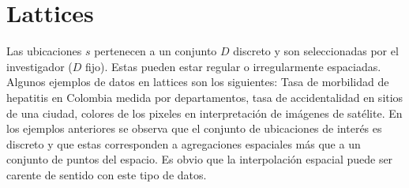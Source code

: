 \section{Lattices}

Las ubicaciones $s$ pertenecen a un conjunto $D$ discreto y son seleccionadas por el investigador ($D$ fijo). Estas pueden estar regular o irregularmente
espaciadas. Algunos ejemplos de datos en lattices son los siguientes: Tasa de morbilidad de hepatitis en Colombia medida por departamentos, tasa de accidentalidad en sitios de una ciudad, colores de los pixeles en interpretación de imágenes de satélite. En los ejemplos
anteriores se observa que el conjunto de ubicaciones de interés es discreto y que estas corresponden a agregaciones espaciales más que a un conjunto de puntos del espacio. Es obvio que la interpolación espacial puede ser carente de sentido con este tipo de datos. \cite{giraldo}
